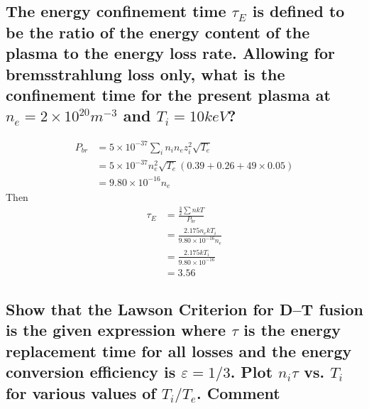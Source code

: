 \documentclass[answers]{exam}
\begin{document}
\begin{questions}
\begin{parts}
\part{The energy confinement time $\tau_E$ is defined to be the ratio of the energy content of the plasma to the energy loss rate. Allowing for bremsstrahlung loss only, what is the confinement time for the present plasma at $n_e = 2 \times 10^{20} \unit{m^{-3}}$ and $T_i = 10 \unit{keV}$?}

\begin{solution}
    \begin{align*}
        P_{br} &= 5 \times 10^{-37} \sum_i n_in_ez_i^2 \sqrt{T_e} \\
               &= 5 \times 10^{-37} n_e^2 \sqrt{T_e} (0.39 + 0.26 + 49 \times 0.05) \\
               &= 9.80 \times 10^{-16}n_e
    \end{align*}
    Then
    \begin{align*}
        \tau_E &= \frac{\frac{3}{2} \sum nkT}{P_{br}} \\
               &= \frac{2.175n_ekT_i}{9.80 \times 10^{-16}n_e} \\
               &= \frac{2.175kT_i}{9.80 \times 10^{-16}} \\
               &= 3.56
    \end{align*}
\end{solution}
\end{parts}

\question{}

\begin{parts}

\part{Show that the Lawson Criterion for D–T fusion is the given expression where $\tau$ is the energy replacement time for all losses and the energy conversion efficiency is $\varepsilon = 1/3$. Plot $n_i\tau$ vs. $T_i$ for various values of $T_i/T_e$. Comment}


\end{parts}
\end{questions}
\end{document}
